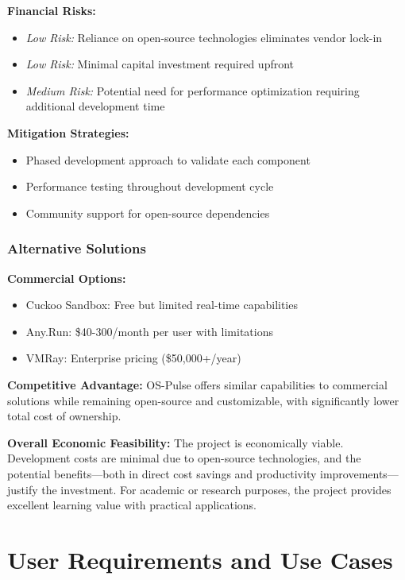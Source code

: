 \textbf{Financial Risks:}
\begin{itemize}
    \item \textit{Low Risk:} Reliance on open-source technologies eliminates vendor lock-in
    \item \textit{Low Risk:} Minimal capital investment required upfront
    \item \textit{Medium Risk:} Potential need for performance optimization requiring additional development time
\end{itemize}

\textbf{Mitigation Strategies:}
\begin{itemize}
    \item Phased development approach to validate each component
    \item Performance testing throughout development cycle
    \item Community support for open-source dependencies
\end{itemize}

\subsubsection{Alternative Solutions}

\textbf{Commercial Options:}
\begin{itemize}
    \item Cuckoo Sandbox: Free but limited real-time capabilities
    \item Any.Run: \$40-300/month per user with limitations
    \item VMRay: Enterprise pricing (\$50,000+/year)
\end{itemize}

\textbf{Competitive Advantage:} OS-Pulse offers similar capabilities to commercial solutions while remaining open-source and customizable, with significantly lower total cost of ownership.

\textbf{Overall Economic Feasibility:} The project is economically viable. Development costs are minimal due to open-source technologies, and the potential benefits—both in direct cost savings and productivity improvements—justify the investment. For academic or research purposes, the project provides excellent learning value with practical applications.

\section{User Requirements and Use Cases}

